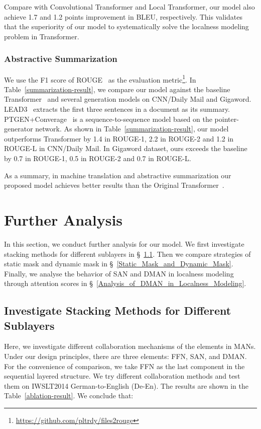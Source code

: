 \documentclass[11pt]{article}
\begin{document}
Compare with Convolutional Transformer and Local Transformer, our model also achieve 1.7 and 1.2 points improvement in BLEU, respectively. This validates that the superiority of our model to systematically solve the localness modeling problem in Transformer.

\subsubsection{Abstractive Summarization}
We use the F1 score of ROUGE~\cite{lin2003automatic} as the evaluation metric\footnote{\url{https://github.com/pltrdy/files2rouge}}. In Table~\ref{summarization-result}, we compare our model against the baseline Transformer~\cite{vaswani2017attention} and several generation models on CNN/Daily Mail and Gigaword. LEAD3~\cite{nallapati2016abstractive} extracts the first three sentences in a document as its summary. PTGEN+Converage~\cite{see2017get} is a sequence-to-sequence model based on the pointer-generator network. As shown in Table~\ref{summarization-result}, our model outperforms Transformer by 1.4 in ROUGE-1, 2.2 in ROUGE-2 and 1.2 in ROUGE-L in CNN/Daily Mail. In Gigaword dataset, ours exceeds the baseline by 0.7 in ROUGE-1, 0.5 in ROUGE-2 and 0.7 in ROUGE-L.  

As a summary, in machine translation and abstractive summarization our proposed model achieves better results than the Original Transformer~\cite{vaswani2017attention}.

\section{Further Analysis}
In this section, we conduct further analysis for our model. We first investigate stacking methods for different sublayers in \S~\ref{Investigate_Stacking_Methods}. Then we compare strategies of static mask and dynamic mask in \S~\ref{Static_Mask_and_Dynamic_Mask}. Finally, we analyse the behavior of SAN and DMAN in localness modeling through attention scores in \S~\ref{Analysis_of_DMAN_in_Localness_Modeling}.
\label{ablation-study}
\subsection{Investigate Stacking Methods for Different Sublayers}
\label{Investigate_Stacking_Methods}
Here, we investigate different collaboration mechanisms of the elements in MANs. Under our design principles, there are three elements: FFN, SAN, and DMAN. For the convenience of comparison, we take FFN as the last component in the sequential layered structure. We try different collaboration methods and test them on IWSLT2014 German-to-English (De-En). The results are shown in the Table~\ref{ablation-result}. We conclude that:
\end{document}
